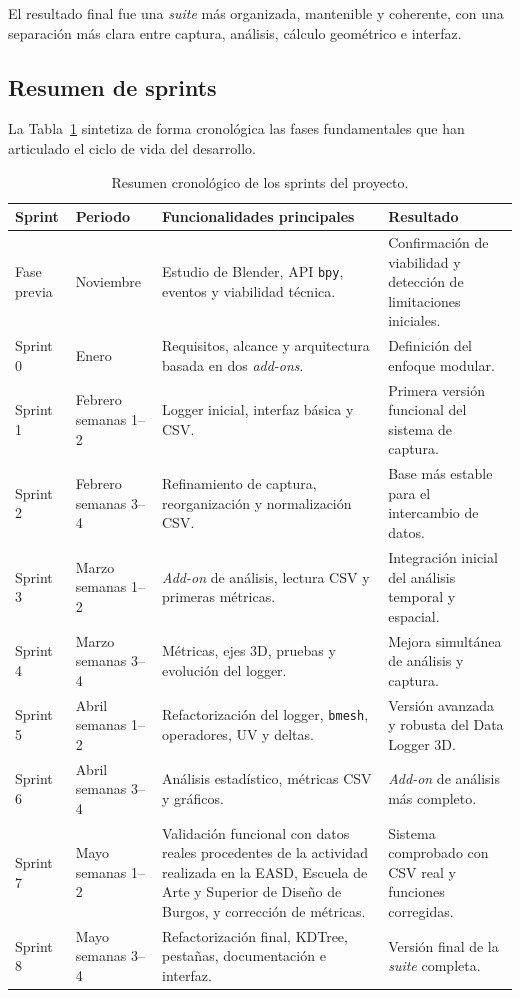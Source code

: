 El resultado final fue una \textit{suite} más organizada, mantenible y coherente, con una separación más clara entre captura, análisis, cálculo geométrico e interfaz.

\subsection{Resumen de sprints}
\label{subsec:a-resumen-sprints}

La Tabla~\ref{tab:sprints_resumen} sintetiza de forma cronológica las fases fundamentales que han articulado el ciclo de vida del desarrollo.

\begin{table}[H]
\centering
\scriptsize
\renewcommand{\arraystretch}{1.25}
\begin{tabularx}{\textwidth}{p{2cm}p{2.4cm}X X}
\toprule
\textbf{Sprint} & \textbf{Periodo} & \textbf{Funcionalidades principales} & \textbf{Resultado} \\
\midrule
Fase previa & Noviembre & Estudio de Blender, API \texttt{bpy}, eventos y viabilidad técnica. & Confirmación de viabilidad y detección de limitaciones iniciales. \\
Sprint 0 & Enero & Requisitos, alcance y arquitectura basada en dos \textit{add-ons}. & Definición del enfoque modular. \\
Sprint 1 & Febrero semanas 1--2 & Logger inicial, interfaz básica y CSV. & Primera versión funcional del sistema de captura. \\
Sprint 2 & Febrero semanas 3--4 & Refinamiento de captura, reorganización y normalización CSV. & Base más estable para el intercambio de datos. \\
Sprint 3 & Marzo semanas 1--2 & \textit{Add-on} de análisis, lectura CSV y primeras métricas. & Integración inicial del análisis temporal y espacial. \\
Sprint 4 & Marzo semanas 3--4 & Métricas, ejes 3D, pruebas y evolución del logger. & Mejora simultánea de análisis y captura. \\
Sprint 5 & Abril semanas 1--2 & Refactorización del logger, \texttt{bmesh}, operadores, UV y deltas. & Versión avanzada y robusta del Data Logger 3D. \\
Sprint 6 & Abril semanas 3--4 & Análisis estadístico, métricas CSV y gráficos. & \textit{Add-on} de análisis más completo. \\
Sprint 7 & Mayo semanas 1--2 & Validación funcional con datos reales procedentes de la actividad realizada en la EASD, Escuela de Arte y Superior de Diseño de Burgos, y corrección de métricas. & Sistema comprobado con CSV real y funciones corregidas. \\
Sprint 8 & Mayo semanas 3--4 & Refactorización final, KDTree, pestañas, documentación e interfaz. & Versión final de la \textit{suite} completa. \\
\bottomrule
\end{tabularx}
\caption{Resumen cronológico de los sprints del proyecto.}
\label{tab:sprints_resumen}
\end{table}

